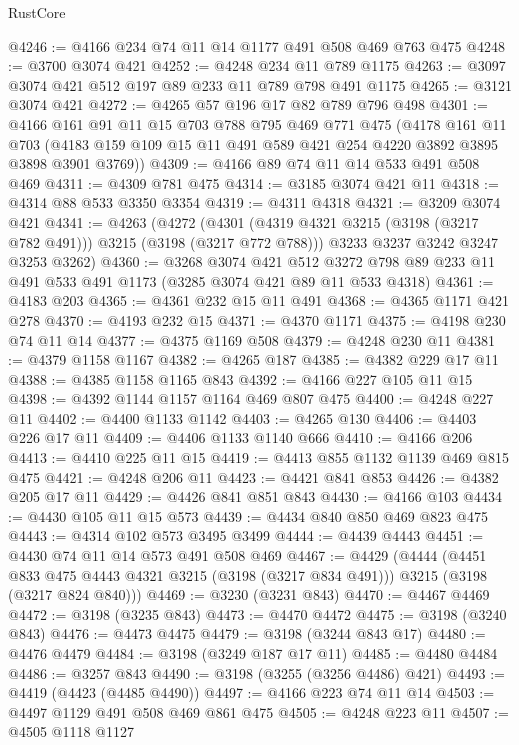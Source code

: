 \begin{lexlean}{RustCore}
\begin{coremodule}
@4246 := @4166 @234 @74 @11 @14 @1177 @491 @508 @469 @763 @475
@4248 := @3700 @3074 @421
@4252 := @4248 @234 @11 @789 @1175
@4263 := @3097 @3074 @421 @512 @197 @89 @233 @11 @789 @798 @491 @1175
@4265 := @3121 @3074 @421
@4272 := @4265 @57 @196 @17 @82 @789 @796 @498
@4301 := @4166
    @161
    @91
    @11
    @15
    @703
    @788
    @795
    @469
    @771
    @475
    (@4178
      @161
      @11
      @703
      (@4183 @159 @109 @15 @11 @491 @589 @421 @254 @4220 @3892 @3895 @3898 @3901 @3769))
@4309 := @4166 @89 @74 @11 @14 @533 @491 @508 @469
@4311 := @4309 @781 @475
@4314 := @3185 @3074 @421 @11
@4318 := @4314 @88 @533 @3350 @3354
@4319 := @4311 @4318
@4321 := @3209 @3074 @421
@4341 := @4263
    (@4272
      (@4301 (@4319 @4321 @3215 (@3198 (@3217 @782 @491))) @3215 (@3198 (@3217 @772 @788)))
      @3233
      @3237
      @3242
      @3247
      @3253
      @3262)
@4360 := @3268
    @3074
    @421
    @512
    @3272
    @798
    @89
    @233
    @11
    @491
    @533
    @491
    @1173
    (@3285 @3074 @421 @89 @11 @533 @4318)
@4361 := @4183 @203
@4365 := @4361 @232 @15 @11 @491
@4368 := @4365 @1171 @421 @278
@4370 := @4193 @232 @15
@4371 := @4370 @1171
@4375 := @4198 @230 @74 @11 @14
@4377 := @4375 @1169 @508
@4379 := @4248 @230 @11
@4381 := @4379 @1158 @1167
@4382 := @4265 @187
@4385 := @4382 @229 @17 @11
@4388 := @4385 @1158 @1165 @843
@4392 := @4166 @227 @105 @11 @15
@4398 := @4392 @1144 @1157 @1164 @469 @807 @475
@4400 := @4248 @227 @11
@4402 := @4400 @1133 @1142
@4403 := @4265 @130
@4406 := @4403 @226 @17 @11
@4409 := @4406 @1133 @1140 @666
@4410 := @4166 @206
@4413 := @4410 @225 @11 @15
@4419 := @4413 @855 @1132 @1139 @469 @815 @475
@4421 := @4248 @206 @11
@4423 := @4421 @841 @853
@4426 := @4382 @205 @17 @11
@4429 := @4426 @841 @851 @843
@4430 := @4166 @103
@4434 := @4430 @105 @11 @15 @573
@4439 := @4434 @840 @850 @469 @823 @475
@4443 := @4314 @102 @573 @3495 @3499
@4444 := @4439 @4443
@4451 := @4430 @74 @11 @14 @573 @491 @508 @469
@4467 := @4429
    (@4444
      (@4451 @833 @475 @4443 @4321 @3215 (@3198 (@3217 @834 @491)))
      @3215
      (@3198 (@3217 @824 @840)))
@4469 := @3230 (@3231 @843)
@4470 := @4467 @4469
@4472 := @3198 (@3235 @843)
@4473 := @4470 @4472
@4475 := @3198 (@3240 @843)
@4476 := @4473 @4475
@4479 := @3198 (@3244 @843 @17)
@4480 := @4476 @4479
@4484 := @3198 (@3249 @187 @17 @11)
@4485 := @4480 @4484
@4486 := @3257 @843
@4490 := @3198 (@3255 (@3256 @4486) @421)
@4493 := @4419 (@4423 (@4485 @4490))
@4497 := @4166 @223 @74 @11 @14
@4503 := @4497 @1129 @491 @508 @469 @861 @475
@4505 := @4248 @223 @11
@4507 := @4505 @1118 @1127

\end{coremodule}
\end{lexlean}
